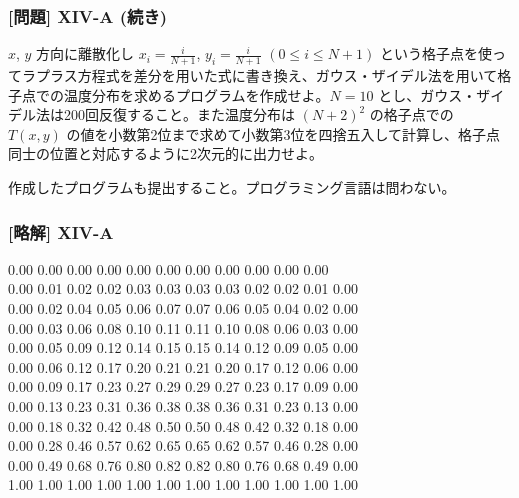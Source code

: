 \documentclass[dvipdfmx,aspectratio=169,20pt]{beamer}
\newcommand{\myfontsetting}[3]{{\fontsize{#1}{#2}\selectfont #3}}
\begin{document}
\begin{frame}
\frametitle{[問題] X\hspace{-.1em}I\hspace{-.1em}V-A (続き)}

\myfontsetting{14pt}{14pt}{
$x$, $y$ 方向に離散化し $x_i=\frac{i}{N+1}$, $y_i=\frac{i}{N+1}$ $(0\le i \le N+1)$ という格子点を使ってラプラス方程式を差分を用いた式に書き換え、ガウス・ザイデル法を用いて格子点での温度分布を求めるプログラムを作成せよ。$N=10$ とし、ガウス・ザイデル法は200回反復すること。また温度分布は $(N+2)^2$ の格子点での $T(x,y)$ の値を小数第2位まで求めて小数第3位を四捨五入して計算し、格子点同士の位置と対応するように2次元的に出力せよ。
}

\myfontsetting{10pt}{10pt}{
作成したプログラムも提出すること。プログラミング言語は問わない。
}

\end{frame}
\begin{frame}
\frametitle{[略解] X\hspace{-.1em}I\hspace{-.1em}V-A}

\myfontsetting{14pt}{14pt}{
0.00 0.00 0.00 0.00 0.00 0.00 0.00 0.00 0.00 0.00 0.00 0.00\\
0.00 0.01 0.02 0.02 0.03 0.03 0.03 0.03 0.02 0.02 0.01 0.00\\
0.00 0.02 0.04 0.05 0.06 0.07 0.07 0.06 0.05 0.04 0.02 0.00\\
0.00 0.03 0.06 0.08 0.10 0.11 0.11 0.10 0.08 0.06 0.03 0.00\\
0.00 0.05 0.09 0.12 0.14 0.15 0.15 0.14 0.12 0.09 0.05 0.00\\
0.00 0.06 0.12 0.17 0.20 0.21 0.21 0.20 0.17 0.12 0.06 0.00\\
0.00 0.09 0.17 0.23 0.27 0.29 0.29 0.27 0.23 0.17 0.09 0.00\\
0.00 0.13 0.23 0.31 0.36 0.38 0.38 0.36 0.31 0.23 0.13 0.00\\
0.00 0.18 0.32 0.42 0.48 0.50 0.50 0.48 0.42 0.32 0.18 0.00\\
0.00 0.28 0.46 0.57 0.62 0.65 0.65 0.62 0.57 0.46 0.28 0.00\\
0.00 0.49 0.68 0.76 0.80 0.82 0.82 0.80 0.76 0.68 0.49 0.00\\
1.00 1.00 1.00 1.00 1.00 1.00 1.00 1.00 1.00 1.00 1.00 1.00\\}

\end{frame}
\end{document}
